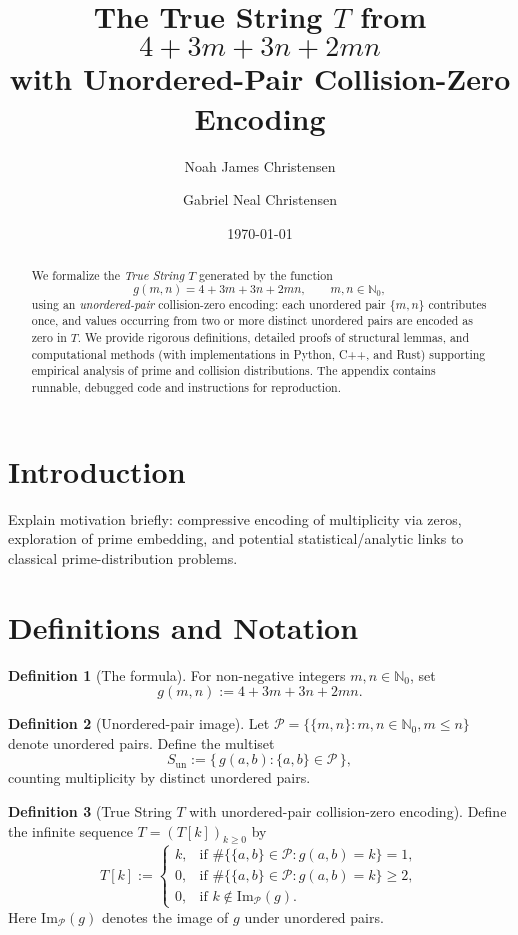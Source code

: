 \documentclass[12pt]{article}
\title{The True String \(T\) from \(4 + 3m + 3n + 2mn\) \\ with Unordered-Pair Collision-Zero Encoding}
\author{Noah James Christensen \and Gabriel Neal Christensen}
\date{\today}
\theoremstyle{definition}
\newtheorem{definition}{Definition}[section]
\theoremstyle{plain}
\begin{document}
\maketitle
\begin{abstract}
We formalize the \emph{True String} \(T\) generated by the function
\[
g(m,n)=4+3m+3n+2mn,\qquad m,n\in\mathbb{N}_0,
\]
using an \emph{unordered-pair} collision-zero encoding: each unordered pair \(\{m,n\}\) contributes once, and values occurring from two or more distinct unordered pairs are encoded as zero in \(T\). We provide rigorous definitions, detailed proofs of structural lemmas, and computational methods (with implementations in Python, C++, and Rust) supporting empirical analysis of prime and collision distributions. The appendix contains runnable, debugged code and instructions for reproduction.
\end{abstract}

\tableofcontents
\newpage

\section{Introduction}
Explain motivation briefly: compressive encoding of multiplicity via zeros, exploration of prime embedding, and potential statistical/analytic links to classical prime-distribution problems.

\section{Definitions and Notation}

\begin{definition}[The formula]
For non-negative integers \(m,n\in\mathbb{N}_0\), set
\[
g(m,n) := 4 + 3m + 3n + 2mn.
\]
\end{definition}

\begin{definition}[Unordered-pair image]
Let \(\mathcal{P}=\{\{m,n\}: m,n\in\mathbb{N}_0, m\le n\}\) denote unordered pairs. Define the multiset
\[
S_{\text{un}} := \{\, g(a,b) : \{a,b\}\in\mathcal{P}\,\},
\]
counting multiplicity by distinct unordered pairs.
\end{definition}

\begin{definition}[True String \(T\) with unordered-pair collision-zero encoding]
Define the infinite sequence \(T=(T[k])_{k\ge0}\) by
\[
T[k] :=
\begin{cases}
k, &\text{if } \#\{\{a,b\}\in\mathcal{P} : g(a,b)=k\} = 1,\\[4pt]
0, &\text{if } \#\{\{a,b\}\in\mathcal{P} : g(a,b)=k\} \ge 2,\\[4pt]
0, &\text{if } k \not\in \mathrm{Im}_{\mathcal{P}}(g).
\end{cases}
\]
Here \(\mathrm{Im}_{\mathcal{P}}(g)\) denotes the image of \(g\) under unordered pairs.
\end{definition}
\end{document}
